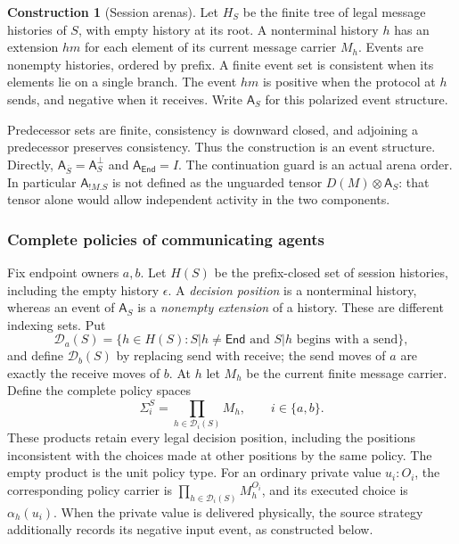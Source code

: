 \documentclass[11pt,a4paper]{article}
\numberwithin{equation}{section}
\theoremstyle{definition}
\newtheorem{construction}[construction]{Construction}
\theoremstyle{remark}
\theoremstyle{plain}
\providecommand{\End}{\mathsf{End}}
\begin{document}
\begin{construction}[Session arenas]
\label{agt-con-sessionarena}
Let $H_S$ be the finite tree of legal message histories of $S$, with empty
history at its root. A nonterminal history $h$ has an extension $hm$ for
each element of its current message carrier $M_h$. Events are nonempty
histories, ordered by prefix. A finite event set is consistent when its
elements lie on a single branch. The event $hm$ is positive when the
protocol at $h$ sends, and negative when it receives. Write
$\mathsf A_S$ for this polarized event structure.
\end{construction}

Predecessor sets are finite, consistency is downward closed, and adjoining
a predecessor preserves consistency. Thus the construction is an event
structure. Directly, $\mathsf A_{\overline S}=\mathsf A_S^\perp$ and
$\mathsf A_{\End}=I$. The continuation guard is an actual arena order.
In particular $\mathsf A_{!M.S}$ is not defined as the unguarded tensor
$D(M)\otimes\mathsf A_S$: that tensor alone would allow independent activity
in the two components.

\subsubsection{Complete policies of communicating agents}

Fix endpoint owners $a,b$.  Let $H(S)$ be the prefix-closed set of
session histories, including the empty history $\epsilon$.  A
\emph{decision position} is a nonterminal history, whereas an event of
$\mathsf A_S$ is a \emph{nonempty extension} of a history.  These are
different indexing sets.  Put
\[
 \mathcal D_a(S)=\{h\in H(S):S|h\ne\End\text{ and }S|h
                    \text{ begins with a send}\},
\]
and define $\mathcal D_b(S)$ by replacing send with receive; the send
moves of $a$ are exactly the receive moves of $b$.  At $h$ let $M_h$ be
the current finite message carrier.  Define the complete policy spaces
\begin{equation}
 \Sigma_i^S=\prod_{h\in\mathcal D_i(S)}M_h,
 \qquad i\in\{a,b\}.
 \label{agt-eq-session-policy}
\end{equation}
These products retain every legal decision position, including the
positions inconsistent with the choices made at other positions by the
same policy.  The empty product is the unit policy type.  For an
ordinary private value $u_i:O_i$, the corresponding policy carrier is
$\prod_{h\in\mathcal D_i(S)}M_h^{O_i}$, and its executed choice is
$\alpha_h(u_i)$.  When the private value is delivered physically, the
source strategy additionally records its negative input event, as
constructed below.
\end{document}
